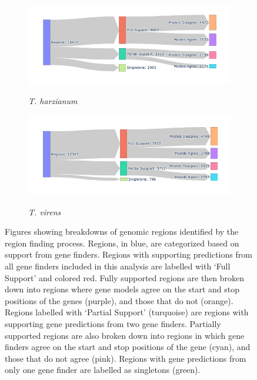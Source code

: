 \begin{figure}
  \ContinuedFloat
  \centering
  \begin{subfigure}{0.9\textwidth}
    \includegraphics[width=\textwidth]{figures/t-harzianum-region-breakdown.png}\label{fig:t-harzianum-regions}
    \caption{\textit{T. harzianum}}
  \end{subfigure}
  \begin{subfigure}{0.9\textwidth}
    \includegraphics[width=\textwidth]{figures/t-virens-region-breakdown.png}\label{fig:t-virens-regions}
    \caption{\textit{T. virens}}
  \end{subfigure}
  \caption[Breakdown of identified regions]{Figures showing breakdowns
    of genomic regions identified by the region finding
    process. Regions, in blue, are categorized based on support from
    gene finders. Regions with supporting predictions from all gene
    finders included in this analysis are labelled with `Full Support'
    and colored red. Fully supported regions are then broken down into
    regions where gene models agree on the start and stop positions of
    the genes (purple), and those that do not (orange). Regions
    labelled with `Partial Support' (turquoise) are regions with
    supporting gene predictions from two gene finders. Partially
    supported regions are also broken down into regions in which gene
    finders agree on the start and stop positions of the gene (cyan),
    and those that do not agree (pink). Regions with gene predictions
    from only one gene finder are labelled as singletons (green).}\label{fig:regions-sankey}
\end{figure}

